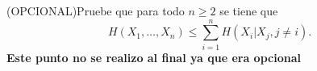 (OPCIONAL)Pruebe que para todo $n \geq 2$ se tiene que 
\[
H(X_1, \dots, X_n) \leq \sum_{i=1}^{n} H(X_i | X_j, j \neq i).
\]
\textbf{Este punto no se realizo al final ya que era opcional}\\


